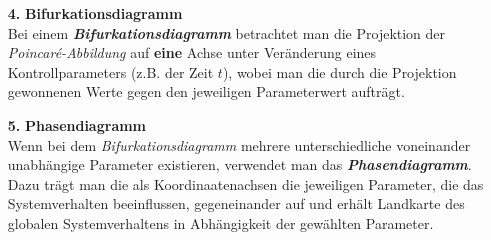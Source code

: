 \begin{itemize}
    \item[\textbf{4.}]{\textbf{Bifurkationsdiagramm}}\\
    Bei einem \textit{\textbf{Bifurkationsdiagramm}} betrachtet man die Projektion der \textit{Poincar\'e-Abbildung} auf \textbf{eine} Achse unter Veränderung eines Kontrollparameters (z.B. der Zeit $t$), wobei man die durch die Projektion gewonnenen Werte gegen den jeweiligen Parameterwert aufträgt. \citep{Lueck}
    \item[\textbf{5.}]{\textbf{Phasendiagramm}}\\
    Wenn bei dem \textit{Bifurkationsdiagramm} mehrere unterschiedliche voneinander unabhängige Parameter existieren, verwendet man das \textit{\textbf{Phasendiagramm}}. Dazu trägt man die als Koordinaatenachsen die jeweiligen Parameter, die das Systemverhalten beeinflussen, gegeneinander auf und erhält Landkarte des globalen Systemverhaltens in Abhängigkeit der gewählten Parameter. \citep{Lueck}    
\end{itemize}